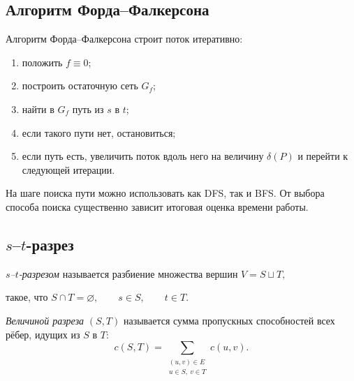 \subsection{Алгоритм Форда--Фалкерсона}

\begin{Statement}{}{}
	Алгоритм Форда--Фалкерсона строит поток итеративно:
	\begin{enumerate}[label=\arabic*)]
		\item положить $f\equiv 0$;
		\item построить остаточную сеть $G_f$;
		\item найти в $G_f$ путь из $s$ в $t$;
		\item если такого пути нет, остановиться;
		\item если путь есть, увеличить поток вдоль него на величину $\delta(P)$ и перейти к следующей итерации.
	\end{enumerate}
\end{Statement}

\begin{Remark}{}{}
	На шаге поиска пути можно использовать как DFS, так и BFS. От выбора способа поиска существенно зависит итоговая оценка времени работы.
\end{Remark}

\subsection{\texorpdfstring{$s$--$t$}{s-t}-разрез}

\begin{Definition}{}{}
	\emph{$s$--$t$-разрезом} называется разбиение множества вершин $V=S \sqcup T,$ 
	
	такое, что $S\cap T=\varnothing,\qquad s\in S,\qquad t\in T.$
\end{Definition}

\begin{Definition}{}{}
	\emph{Величиной разреза} $(S,T)$ называется сумма пропускных способностей всех рёбер, идущих из $S$ в $T$:
	\[
	c(S,T)=\sum_{\substack{(u,v)\in E\\ u\in S,\ v\in T}} c(u,v).
	\]
\end{Definition}

